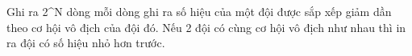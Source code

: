 Ghi ra 2^N dòng mỗi dòng ghi ra số hiệu của một đội được sắp xếp giảm dần theo cơ hội vô địch của đội đó. Nếu 2 đội có cùng cơ hội vô địch như nhau thì in ra đội có số hiệu nhỏ hơn trước.